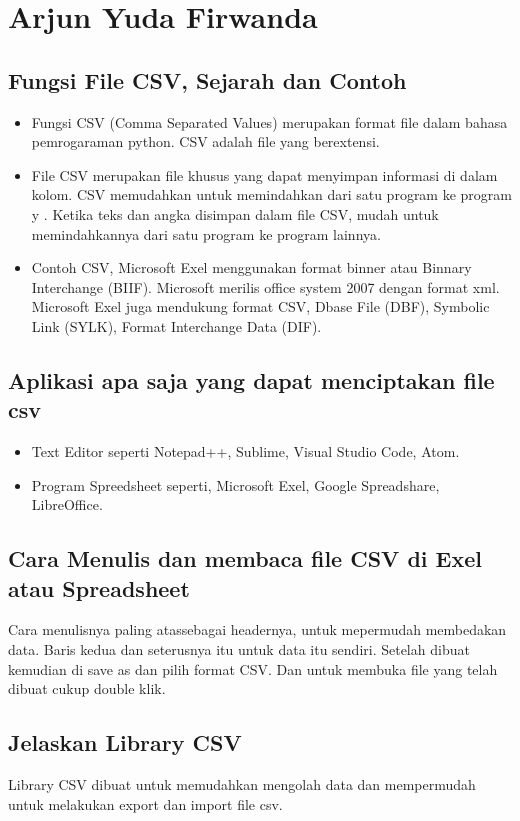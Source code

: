 \section{Arjun Yuda Firwanda}

\subsection {Fungsi File CSV, Sejarah dan Contoh}
\begin{itemize}
    \item Fungsi CSV (Comma Separated Values) merupakan format file dalam bahasa pemrogaraman python. CSV adalah file yang berextensi.
    \item File CSV merupakan file khusus yang dapat menyimpan informasi di dalam kolom. CSV memudahkan untuk memindahkan dari satu program ke program y .  Ketika teks dan angka disimpan dalam file CSV, mudah untuk memindahkannya dari satu program ke program lainnya.
    \item Contoh CSV, Microsoft Exel menggunakan format binner atau Binnary Interchange (BIIF). Microsoft merilis office system 2007 dengan format xml. Microsoft Exel juga mendukung format CSV, Dbase File (DBF), Symbolic Link (SYLK), Format Interchange Data (DIF).
\end{itemize}

\subsection {Aplikasi apa saja yang dapat menciptakan file csv}
\begin{itemize}
    \item Text Editor seperti Notepad++, Sublime, Visual Studio Code, Atom.
    \item Program Spreedsheet seperti, Microsoft Exel, Google Spreadshare, LibreOffice.
\end{itemize}

\subsection {Cara Menulis dan membaca file CSV di Exel atau Spreadsheet}
Cara menulisnya paling atassebagai headernya, untuk mepermudah membedakan data. Baris kedua dan seterusnya itu untuk data itu sendiri. Setelah dibuat kemudian di save as dan pilih format CSV. Dan untuk membuka file yang telah dibuat cukup double klik.

\subsection {Jelaskan Library CSV}
Library CSV dibuat untuk memudahkan mengolah data dan mempermudah untuk melakukan export dan import file csv.

